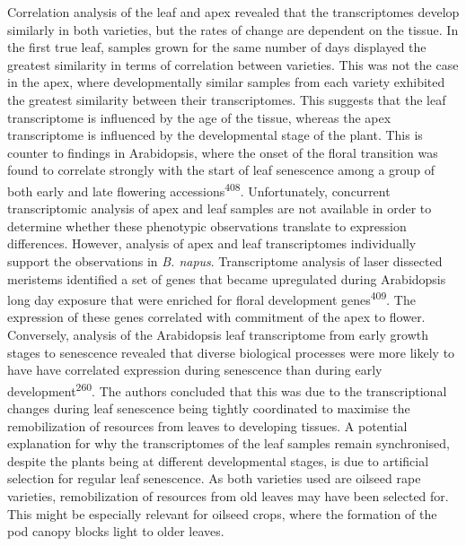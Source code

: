 \documentclass[12pt,]{book}
\begin{document}
Correlation analysis of the leaf and apex revealed that the
transcriptomes develop similarly in both varieties, but the rates of
change are dependent on the tissue. In the first true leaf, samples
grown for the same number of days displayed the greatest similarity in
terms of correlation between varieties. This was not the case in the
apex, where developmentally similar samples from each variety exhibited
the greatest similarity between their transcriptomes. This suggests that
the leaf transcriptome is influenced by the age of the tissue, whereas
the apex transcriptome is influenced by the developmental stage of the
plant. This is counter to findings in Arabidopsis, where the onset of
the floral transition was found to correlate strongly with the start of
leaf senescence among a group of both early and late flowering
accessions\textsuperscript{408}. Unfortunately, concurrent
transcriptomic analysis of apex and leaf samples are not available in
order to determine whether these phenotypic observations translate to
expression differences. However, analysis of apex and leaf
transcriptomes individually support the observations in \emph{B. napus}.
Transcriptome analysis of laser dissected meristems identified a set of
genes that became upregulated during Arabidopsis long day exposure that
were enriched for floral development genes\textsuperscript{409}. The
expression of these genes correlated with commitment of the apex to
flower. Conversely, analysis of the Arabidopsis leaf transcriptome from
early growth stages to senescence revealed that diverse biological
processes were more likely to have have correlated expression during
senescence than during early development\textsuperscript{260}. The
authors concluded that this was due to the transcriptional changes
during leaf senescence being tightly coordinated to maximise the
remobilization of resources from leaves to developing tissues. A
potential explanation for why the transcriptomes of the leaf samples
remain synchronised, despite the plants being at different developmental
stages, is due to artificial selection for regular leaf senescence. As
both varieties used are oilseed rape varieties, remobilization of
resources from old leaves may have been selected for. This might be
especially relevant for oilseed crops, where the formation of the pod
canopy blocks light to older leaves.
\end{document}
